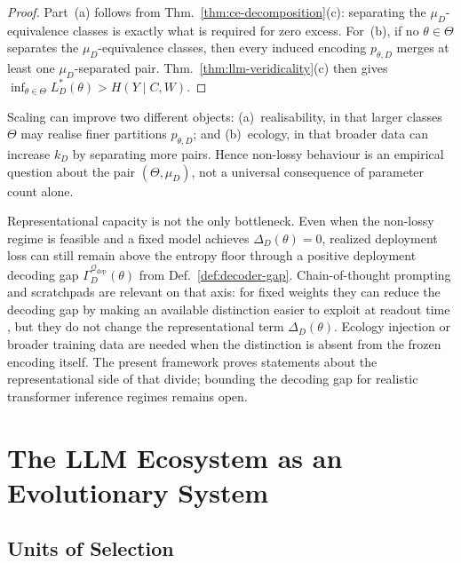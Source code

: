 \documentclass[twoside,11pt]{article}
\newcommand{\thmref}[1]{Thm.~\ref{#1}}
\newcommand{\defref}[1]{Def.~\ref{#1}}
\begin{document}
\begin{proof}
Part~(a) follows from \thmref{thm:ce-decomposition}(c): separating the $\mu_D$-equivalence classes is exactly what is required for zero excess. For~(b), if no $\theta \in \Theta$ separates the $\mu_D$-equivalence classes, then every induced encoding $p_{\theta,D}$ merges at least one $\mu_D$-separated pair. \thmref{thm:llm-veridicality}(c) then gives $\inf_{\theta \in \Theta} L_D^*(\theta) > H(Y \mid C,W)$.
\end{proof}

Scaling can improve two different objects: (a)~realisability, in that larger classes $\Theta$ may realise finer partitions $p_{\theta,D}$; and (b)~ecology, in that broader data can increase $k_D$ by separating more pairs. Hence non-lossy behaviour is an empirical question about the pair $(\Theta, \mu_D)$, not a universal consequence of parameter count alone.

Representational capacity is not the only bottleneck. Even when the non-lossy regime is feasible and a fixed model achieves $\Delta_D(\theta)=0$, realized deployment loss can still remain above the entropy floor through a positive deployment decoding gap $\Gamma_D^{\mathcal{Q}_{\mathrm{dep}}}(\theta)$ from \defref{def:decoder-gap}. Chain-of-thought prompting and scratchpads are relevant on that axis: for fixed weights they can reduce the decoding gap by making an available distinction easier to exploit at readout time \citep{wei_etal_2022_cot,nye_etal_2021_scratchpads}, but they do not change the representational term $\Delta_D(\theta)$. Ecology injection or broader training data are needed when the distinction is absent from the frozen encoding itself. The present framework proves statements about the representational side of that divide; bounding the decoding gap for realistic transformer inference regimes remains open.

\section{The LLM Ecosystem as an Evolutionary System}\label{sec:evolution}

\subsection{Units of Selection}
\end{document}
